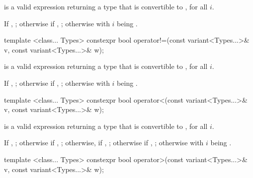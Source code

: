 \begin{itemdescr}
\pnum
\requires
{} is a valid expression returning a type that is
convertible to , for all $i$.

\pnum
\returns
If , ;
otherwise if , ;
otherwise  with $i$ being .
\end{itemdescr}

%
\begin{itemdecl}
template <class... Types>
  constexpr bool operator!=(const variant<Types...>& v, const variant<Types...>& w);
\end{itemdecl}

\begin{itemdescr}
\pnum
\requires
{} is a valid expression returning a type that is
convertible to , for all $i$.

\pnum
\returns
If , ;
otherwise if , ;
otherwise  with $i$ being .
\end{itemdescr}

%
\begin{itemdecl}
template <class... Types>
  constexpr bool operator<(const variant<Types...>& v, const variant<Types...>& w);
\end{itemdecl}

\begin{itemdescr}
\pnum
\requires
{} is a valid expression returning a type that is
convertible to , for all $i$.

\pnum
\returns
If , ;
otherwise if , ;
otherwise, if , ;
otherwise if , ;
otherwise  with $i$ being .
\end{itemdescr}

%
\begin{itemdecl}
template <class... Types>
  constexpr bool operator>(const variant<Types...>& v, const variant<Types...>& w);
\end{itemdecl}

